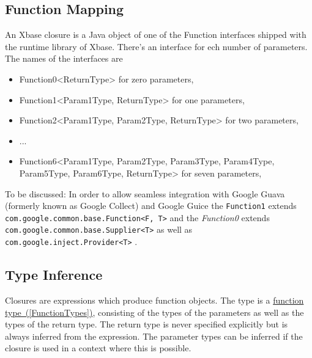 \documentclass[a4paper,10pt]{scrreprt}
\newlength{\itemindentlen}
\begin{document}
\subsection{Function Mapping}
\label{FunctionMapping}
An Xbase closure is a Java object of one of the Function interfaces shipped with the runtime library of Xbase. There's an interface for ech number of parameters.
The names of the interfaces are 

\setlength{\itemindentlen}{\textwidth}
\begin{itemize}
\addtolength{\itemindentlen}{-2em}

\item \begin{minipage}[t]{\itemindentlen}
Function0<ReturnType> for zero parameters, 
\end{minipage}

\item \begin{minipage}[t]{\itemindentlen}
Function1<Param1Type, ReturnType> for one parameters, 
\end{minipage}

\item \begin{minipage}[t]{\itemindentlen}
Function2<Param1Type, Param2Type, ReturnType> for two parameters, 
\end{minipage}

\item \begin{minipage}[t]{\itemindentlen}
... 
\end{minipage}

\item \begin{minipage}[t]{\itemindentlen}
Function6<Param1Type, Param2Type, Param3Type, Param4Type, Param5Type, Param6Type, ReturnType> for seven parameters, 
\end{minipage}

\end{itemize}
\addtolength{\itemindentlen}{2em}


To be discussed: In order to allow seamless integration with Google Guava (formerly known as Google Collect) and Google Guice the \lstinline{Function1}
 extends \lstinline{com.google.common.base.Function<F, T>}
 and the
\emph{Function0} extends \lstinline{com.google.common.base.Supplier<T>}
 as well as \lstinline{com.google.inject.Provider<T>}
.




\subsection{Type Inference}
\label{ClosuresTypeInference}
Closures are expressions which produce function objects. The type is a 
\hyperref[FunctionTypes]{function type~(\ref*{FunctionTypes})}, consisting of the types of the parameters as well as the types of the return type.
The return type is never specified explicitly but is always inferred from the expression. The parameter types can be inferred if the closure is used in a context where this is possible.
\end{document}
